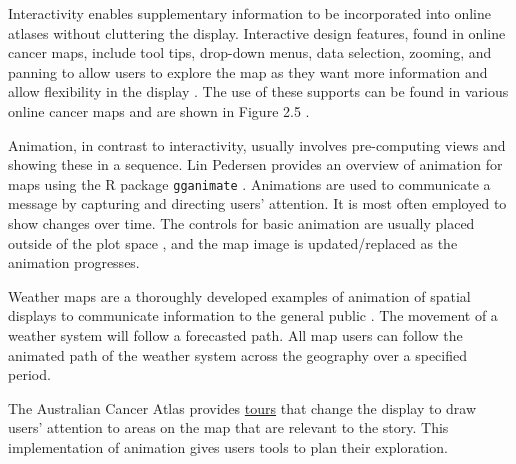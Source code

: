 \documentclass{monashthesis}
\begin{document}
Interactivity enables supplementary information to be incorporated into online atlases without cluttering the display. Interactive design features, found in online cancer maps, include tool tips, drop-down menus, data selection, zooming, and panning to allow users to explore the map as they want more information and allow flexibility in the display \autocite{HTLWM}. The use of these supports can be found in various online cancer maps and are shown in Figure 2.5 \autocite{roberts2019communication}.

Animation, in contrast to interactivity, usually involves pre-computing views and showing these in a sequence. Lin Pedersen \autocite{TGA} provides an overview of animation for maps using the R package \texttt{gganimate} \autocite{gganimate}. Animations are used to communicate a message by capturing and directing users' attention. It is most often employed to show changes over time. The controls for basic animation are usually placed outside of the plot space \autocite{TGA}, and the map image is updated/replaced as the animation progresses.

Weather maps are a thoroughly developed examples of animation of spatial displays to communicate information to the general public \autocite{CPISACA}. The movement of a weather system will follow a forecasted path. All map users can follow the animated path of the weather system across the geography over a specified period.

The Australian Cancer Atlas \autocite{TACA} provides \href{https://atlas.cancer.org.au/app/tour/lungcancer}{tours} that change the display to draw users' attention to areas on the map that are relevant to the story.
This implementation of animation gives users tools to plan their exploration.
\end{document}
